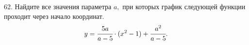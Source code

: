 62. Найдите все значения параметра $a,$ при которых график следующей функции проходит через начало координат.
$$y=\cfrac{5a}{a-5}\cdot(x^2-1)+\cfrac{a^2}{a-5}.$$

